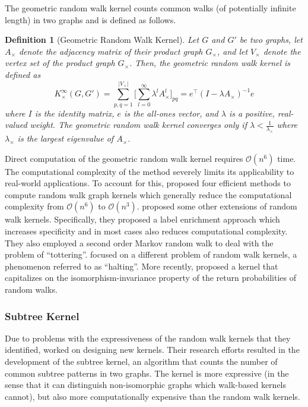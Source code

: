 \documentclass[twoside,11pt]{article}
\newtheorem{definition}{Definition}
\begin{document}
The geometric random walk kernel counts common walks (of potentially infinite length) in two graphs and is defined as follows.  
\begin{definition}[Geometric Random Walk Kernel]
  Let $G$ and $G'$ be two graphs, let $A_\times$ denote the adjacency matrix of their product graph $G_\times$, and let $V_\times$ denote the vertex set of the product graph $G_\times$.
  Then, the geometric random walk kernel is defined as
  \begin{equation}
      K_{\times}^{\infty}(G,G') = \sum_{p,q=1}^{|V_{\times}|} \Big[ \sum_{l=0}^{\infty} \lambda^l A_{\times}^l \Big]_{pq} = e^\top(I - \lambda A_{\times})^{-1} e
    \end{equation}
  where $I$ is the identity matrix, $e$ is the all-ones vector, and $\lambda$ is a positive, real-valued weight.
  The geometric random walk kernel converges only if $\lambda < \frac{1}{\lambda_\times}$ where $\lambda_\times$ is the largest eigenvalue of $A_{\times}$.
\end{definition}
Direct computation of the geometric random walk kernel requires $\mathcal{O}(n^6)$ time.
The computational complexity of the method severely limits its applicability to real-world applications.
To account for this,  proposed four efficient methods to compute random walk graph kernels which generally reduce the computational complexity from $\mathcal{O}(n^6)$ to $\mathcal{O}(n^3)$.
 proposed some other extensions of random walk kernels.
Specifically, they proposed a label enrichment approach which increases specificity and in most cases also reduces computational complexity.
They also employed a second order Markov random walk to deal with the problem of ``tottering''.
 focused on a different problem of random walk kernels, a phenomenon referred to as ``halting''.
More recently,  proposed a kernel that capitalizes on the isomorphism-invariance property of the return probabilities of random walks.

\subsubsection{Subtree Kernel}
Due to problems with the expressiveness of the random walk kernels that they identified,  worked on designing new kernels.
Their research efforts resulted in the development of the subtree kernel, an algorithm that counts the number of common subtree patterns in two graphs.
The kernel is more expressive (in the sense that it can distinguish non-isomorphic graphs which walk-based kernels cannot), but also more computationally expensive than the random walk kernels.
\end{document}
